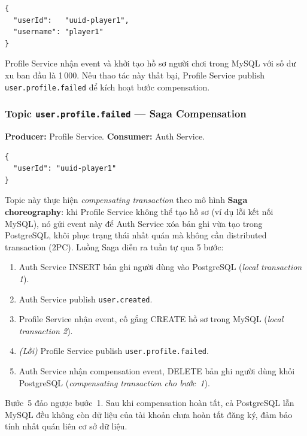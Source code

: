 \documentclass[12pt,a4paper]{report}
\newcommand{\topic}[1]{\texttt{\textcolor{micropurple}{#1}}}
\begin{document}
\begin{lstlisting}[style=jsonStyle,
  caption={Payload topic \texttt{user.created} (Auth -> Profile)}]
{
  "userId":   "uuid-player1",
  "username": "player1"
}
\end{lstlisting}

Profile Service nhận event và khởi tạo hồ sơ người chơi trong MySQL với số dư xu ban đầu
là 1\,000. Nếu thao tác này thất bại, Profile Service publish \topic{user.profile.failed}
để kích hoạt bước compensation.

\subsubsection{Topic \texttt{user.profile.failed} --- Saga Compensation}

\textbf{Producer:} Profile Service. \quad \textbf{Consumer:} Auth Service.

\begin{lstlisting}[style=jsonStyle,
  caption={Payload topic \texttt{user.profile.failed} (Profile -> Auth, compensation)}]
{
  "userId": "uuid-player1"
}
\end{lstlisting}

Topic này thực hiện \textit{compensating transaction} theo mô hình \textbf{Saga choreography}:
khi Profile Service không thể tạo hồ sơ (ví dụ lỗi kết nối MySQL), nó gửi event này để
Auth Service xóa bản ghi vừa tạo trong PostgreSQL, khôi phục trạng thái nhất quán mà không
cần distributed transaction (2PC). Luồng Saga diễn ra tuần tự qua 5 bước:

\begin{enumerate}
  \item Auth Service INSERT bản ghi người dùng vào PostgreSQL (\textit{local transaction 1}).
  \item Auth Service publish \topic{user.created}.
  \item Profile Service nhận event, cố gắng CREATE hồ sơ trong MySQL (\textit{local
        transaction 2}).
  \item \textit{(Lỗi)} Profile Service publish \topic{user.profile.failed}.
  \item Auth Service nhận compensation event, DELETE bản ghi người dùng khỏi PostgreSQL
        (\textit{compensating transaction cho bước~1}).
\end{enumerate}

Bước~5 đảo ngược bước~1. Sau khi compensation hoàn tất, cả PostgreSQL lẫn MySQL đều không
còn dữ liệu của tài khoản chưa hoàn tất đăng ký, đảm bảo tính nhất quán liên cơ sở dữ liệu.
\end{document}
